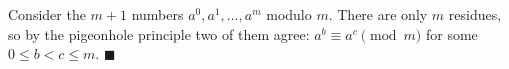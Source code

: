 Consider the $m+1$ numbers $a^0,a^1,\dots,a^m$ modulo $m$. There are only $m$ residues, so by the pigeonhole principle two of them agree: $a^b\equiv a^c\pmod m$ for some $0\le b<c\le m$. $\blacksquare$
